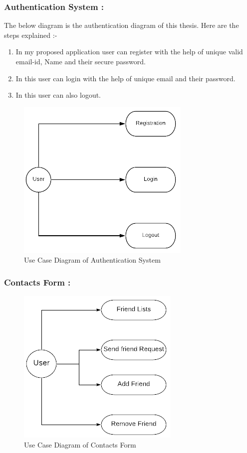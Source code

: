 \subsubsection{Authentication System :}
The below diagram is the authentication diagram of this thesis. Here are the steps explained :-
\begin{enumerate}
	\setlength{\itemsep}{-0.3em}
	\item In my proposed application user can register with the help of unique valid email-id, Name and their secure password.\\
	\item In this user can login with the help of unique email and their password.\\
	\item In this user can also logout.
	
\end{enumerate}
\noindent
\begin{figure}[!ht]
	\centering
	\includegraphics[scale=0.8]{auth.png}
	\caption{\label{img4}  Use Case Diagram of Authentication System}
\end{figure}
\noindent

\subsubsection{Contacts Form :}
\noindent
\begin{figure}[!ht]
	\centering
	\includegraphics[scale=0.9]{friends.png}
	\caption{\label{img5}  Use Case Diagram of Contacts Form}
\end{figure}
\vspace{50ex}
